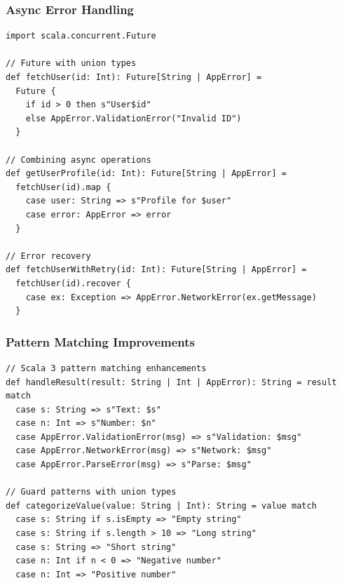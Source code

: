 \documentclass{beamer}
\begin{document}
\begin{frame}[fragile]
\frametitle{Async Error Handling}

\begin{lstlisting}[style=scalaStyle]
import scala.concurrent.Future

// Future with union types
def fetchUser(id: Int): Future[String | AppError] = 
  Future {
    if id > 0 then s"User$id"
    else AppError.ValidationError("Invalid ID")
  }

// Combining async operations
def getUserProfile(id: Int): Future[String | AppError] = 
  fetchUser(id).map {
    case user: String => s"Profile for $user"
    case error: AppError => error
  }

// Error recovery
def fetchUserWithRetry(id: Int): Future[String | AppError] = 
  fetchUser(id).recover {
    case ex: Exception => AppError.NetworkError(ex.getMessage)
  }
\end{lstlisting}

\end{frame}

\begin{frame}[fragile]
\frametitle{Pattern Matching Improvements}

\begin{lstlisting}[style=scalaStyle]
// Scala 3 pattern matching enhancements
def handleResult(result: String | Int | AppError): String = result match
  case s: String => s"Text: $s"
  case n: Int => s"Number: $n"
  case AppError.ValidationError(msg) => s"Validation: $msg"
  case AppError.NetworkError(msg) => s"Network: $msg"
  case AppError.ParseError(msg) => s"Parse: $msg"

// Guard patterns with union types
def categorizeValue(value: String | Int): String = value match
  case s: String if s.isEmpty => "Empty string"
  case s: String if s.length > 10 => "Long string"
  case s: String => "Short string"
  case n: Int if n < 0 => "Negative number"
  case n: Int => "Positive number"
\end{lstlisting}

\end{frame}
\end{document}
